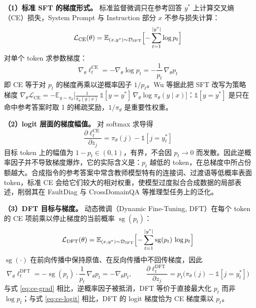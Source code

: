 \documentclass[fontset=fandol,type=master,campus=shenzhen,etitleauto=true]{hithesisbook}
\begin{document}
\textbf{（1）标准 SFT 的梯度形式。} 标准监督微调只在参考回答 $y^*$ 上计算交叉熵（CE）损失，System Prompt 与 Instruction 部分 $x$ 不参与损失计算：
\begin{equation}
\mathcal{L}_{\text{CE}}(\theta) = \mathbb{E}_{(x, y^*) \sim \mathcal{D}_{\text{SFT}}} \Bigl[ -\sum_{t=1}^{|y^*|} \log p_t \Bigr]
\end{equation}
对单个 token 求参数梯度：
\begin{equation}\label{eq:ce-grad}
\nabla_\theta \ell_t^{\text{CE}} = -\nabla_\theta \log p_t = -\frac{1}{p_t}\,\nabla_\theta p_t
\end{equation}
即 CE 等于对 $p_t$ 的梯度再乘以逆概率因子 $1/p_t$。Wu 等\cite{ref82}据此把 SFT 改写为策略梯度 $\nabla_\theta \mathcal{L}_{\text{CE}} = -\mathbb{E}_{y \sim \pi_\theta}\bigl[\tfrac{1}{\pi_\theta(y \mid x)}\,\mathbb{1}[y = y^*]\,\nabla_\theta \log \pi_\theta(y \mid x)\bigr]$：$\mathbb{1}[y = y^*]$ 是只在命中参考答案时取 1 的稀疏奖励，$1/\pi_\theta$ 是重要性权重。

\textbf{（2）logit 层面的梯度幅值。} 对 softmax 求导得
\begin{equation}\label{eq:ce-logit}
\frac{\partial \ell_t^{\text{CE}}}{\partial z_j} = \pi_\theta(j) - \mathbb{1}[j = y_t^*]
\end{equation}
目标 token 上的幅值为 $1 - p_t \in (0, 1)$，有界，不会因 $p_t \to 0$ 而发散。因此逆概率因子并不导致梯度爆炸，它的实际含义是：$p_t$ 越低的 token，在总梯度中所占份额越大。合成指令的参考答案中常含教师模型特有的连接词、过渡语等低概率表面 token，标准 CE 会给它们较大的相对权重，使模型过度拟合合成数据的局部表述，削弱其在 FaultDiag 与 CrossDomainQA 等推理型任务上的泛化。

\textbf{（3）DFT 目标与梯度。} 动态微调（Dynamic Fine-Tuning, DFT）\cite{ref82}在每个 token 的 CE 项前乘以停止梯度的当前概率 $\operatorname{sg}(p_t)$：
\begin{equation}
\mathcal{L}_{\text{DFT}}(\theta) = \mathbb{E}_{(x, y^*) \sim \mathcal{D}_{\text{SFT}}} \Bigl[ -\sum_{t=1}^{|y^*|} \operatorname{sg}(p_t)\,\log p_t \Bigr]
\end{equation}
$\operatorname{sg}(\cdot)$ 在前向传播中保持原值、在反向传播中不回传梯度，因此
\begin{equation}
\nabla_\theta \ell_t^{\text{DFT}} = -\operatorname{sg}(p_t) \cdot \frac{1}{p_t}\,\nabla_\theta p_t = -\nabla_\theta p_t, \qquad
\frac{\partial \ell_t^{\text{DFT}}}{\partial z_j} = p_t \bigl( \pi_\theta(j) - \mathbb{1}[j = y_t^*] \bigr)
\end{equation}
与式 \eqref{eq:ce-grad} 相比，逆概率因子被抵消，DFT 等价于直接最大化 $p_t$ 而非 $\log p_t$；与式 \eqref{eq:ce-logit} 相比，DFT 的 logit 梯度恰为 CE 梯度乘以 $p_t$。
\end{document}
